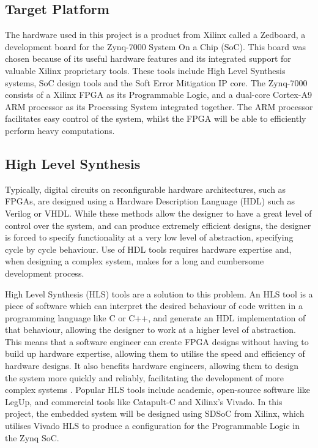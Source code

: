 \documentclass[12pt]{article}
\begin{document}
\subsection{Target Platform}
\label{sec:Background-TargetPlatform}
\vspace{-12pt}

The hardware used in this project is a product from Xilinx called a Zedboard, a development board for the Zynq-7000 System On a Chip (SoC). This board was chosen because of its useful hardware features and its integrated support for valuable Xilinx proprietary tools. These tools include High Level Synthesis systems, SoC design tools and the Soft Error Mitigation IP core. The Zynq-7000 consists of a Xilinx FPGA as its Programmable Logic, and a dual-core Cortex-A9 ARM processor as its Processing System integrated together. The ARM processor facilitates easy control of the system, whilst the FPGA will be able to efficiently perform heavy computations.


\subsection{High Level Synthesis}
\label{sec:Background-HLS}
\vspace{-12pt}

Typically, digital circuits on reconfigurable hardware architectures, such as FPGAs, are designed using a Hardware Description Language (HDL) such as Verilog or VHDL. While these methods allow the designer to have a great level of control over the system, and can produce extremely efficient designs, the designer is forced to specify functionality at a very low level of abstraction, specifying cycle by cycle behaviour. Use of HDL tools requires hardware expertise and, when designing a complex system, makes for a long and cumbersome development process.

High Level Synthesis (HLS) tools are a  solution to this problem. An HLS tool is a piece of software which can interpret the desired behaviour of code written in a programming language like C or C++, and generate an HDL implementation of that behaviour, allowing the designer to work at a higher level of abstraction. This means that a software engineer can create FPGA designs without having to build up hardware expertise, allowing them to utilise the speed and efficiency of hardware designs. It also benefits hardware engineers, allowing them to design the system more quickly and reliably, facilitating the development of more complex systems \cite{HLS}. Popular HLS tools include academic, open-source software like LegUp, and commercial tools like Catapult-C and Xilinx's Vivado. In this project, the embedded system will be designed using SDSoC from Xilinx, which utilises Vivado HLS to produce a configuration for the Programmable Logic in the Zynq SoC.
\end{document}
